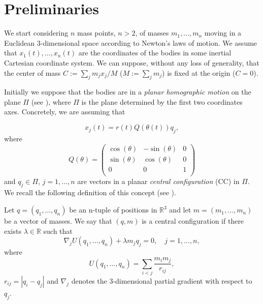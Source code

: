 \documentclass[smallcondensed]{svjour3}
\newcommand{\rr}{\mathbb{R}}
\begin{document}
\section{Preliminaries}\label{sec:pre}

We start considering $n$  mass points, $n>2$, of masses $m_1,\ldots,m_n$ moving in a Euclidean 3-dimensional space according to Newton's laws of motion. We assume that $x_1(t),\ldots,x_n(t)$ are the coordinates of the bodies in some inertial Cartesian coordinate system.  We can suppose, without any loss of generality, that the center of mass   $C:=\sum_jm_jx_j/M$ ($M:=\sum_j m_j$) is fixed at the origin ($C=0$).

Initially we suppose that the bodies are in a \emph{planar homographic motion} on the plane $\Pi$ (see \cite{JaumeLlibre276}), where  $\Pi$ is the plane determined by the first two coordinates axes. Concretely,  we are assuming  that

\begin{equation}\label{eq:x_j=rtQtq_j}
 x_j(t)=r(t)Q(\theta (t))q_j,
\end{equation}
where
\[
 Q(\theta )=\begin{pmatrix}
           \cos(\theta ) & -\sin(\theta ) & 0\\
           \sin(\theta ) & \cos(\theta ) & 0\\
           0            &     0     &  1\\
          \end{pmatrix}
\]
and $q_j\in\Pi$, $j=1,\ldots,n$ are vectors in a planar \emph{central configuration} (CC) in $\Pi$. We recall the following definition of this concept (see \cite{JaumeLlibre276}).

\begin{definition}\label{def:CC}
Let $q=(q_1,\ldots,q_n)$ be  an n-tuple of positions in $\rr^3$ and let $m=(m_1,\ldots,m_n)$ be a vector of masses. We say that $(q,m)$ is a central configuration if
there exists $\lambda\in\rr$ such that
\begin{equation}\label{eq:def.CC}
\nabla_jU(q_1,\ldots,q_n)+\lambda m_jq_j=0,\quad j=1,\ldots,n,
\end{equation}
where
\begin{equation}\label{eq:potencial}
 U(q_1,\ldots,q_n)=\sum_{i<j}\frac{m_im_j}{r_{ij}},
\end{equation}
 $r_{ij}=|q_i-q_j|$ and $\nabla_j$ denotes the $3$-dimensional partial gradient with respect to $q_j$.
\end{definition}
\end{document}
